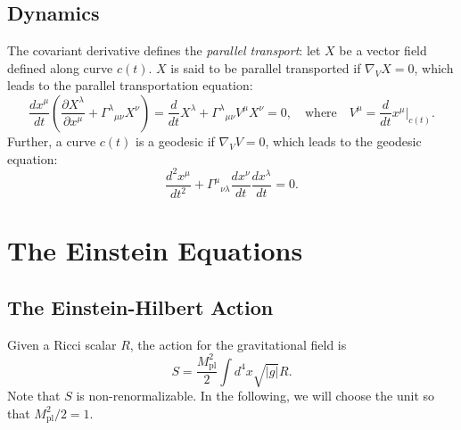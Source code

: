 \documentclass[aps,prb,superscriptaddress,nofootinbib]{revtex4}
\begin{document}
\subsection{Dynamics}

The covariant derivative defines the \textit{parallel transport}: let $X$ be a vector field defined along curve $c(t)$.
$X$ is said to be parallel transported if $\nabla_V X = 0$, which leads to the parallel transportation equation:
\begin{equation*}
	\frac{d x^\mu}{dt}\left(\frac{\partial X^\lambda}{\partial x^\mu} +{\Gamma^\lambda}_{\mu\nu} X^\nu \right) = \frac{d}{dt}X^\lambda +{\Gamma^\lambda}_{\mu\nu} V^\mu X^\nu = 0,\quad \text{where}\quad V^\mu = \frac{d}{dt} x^\mu|_{c(t)}.
\end{equation*}
Further, a curve $c(t)$ is a geodesic if $\nabla_V V = 0$, which leads to the geodesic equation:
\begin{equation*}
	\frac{d^2 x^\mu}{dt^2} + {\Gamma^\mu}_{\nu\lambda} \frac{dx^\nu}{dt}\frac{dx^\lambda}{dt} = 0.
\end{equation*}




\section{The Einstein Equations}


\subsection{The Einstein-Hilbert Action}

Given a Ricci scalar $R$, the action for the gravitational field is
\begin{equation}
	S = \frac{M^2_\mathrm{pl}}{2} \int d^4 x \sqrt{|g|} R.
\end{equation}
Note that $S$ is non-renormalizable.
In the following, we will choose the unit so that $M^2_\text{pl}/2=1$.
\end{document}
